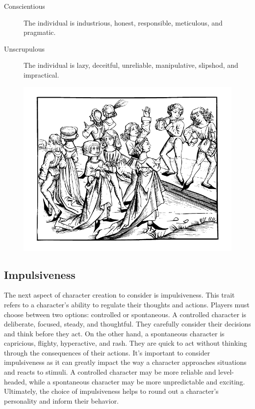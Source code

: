 \documentclass[12pt]{book}
\begin{document}
\begin{description}
    \item[Conscientious] The individual is industrious, honest, responsible, meticulous, and pragmatic.
    \item[Unscrupulous] The individual is lazy, deceitful, unreliable, manipulative, slipshod, and impractical.
\end{description}

\begin{figure}[h]
    \centering
    \includegraphics[width=\textwidth]{./images/personality04.pdf}
\end{figure}

\subsection{\textbf{Impulsiveness}}

The next aspect of character creation to consider is impulsiveness. This trait refers to a character's ability to regulate their thoughts and actions. Players must choose between two options: controlled or spontaneous. A controlled character is deliberate, focused, steady, and thoughtful. They carefully consider their decisions and think before they act. On the other hand, a spontaneous character is capricious, flighty, hyperactive, and rash. They are quick to act without thinking through the consequences of their actions. It's important to consider impulsiveness as it can greatly impact the way a character approaches situations and reacts to stimuli. A controlled character may be more reliable and level-headed, while a spontaneous character may be more unpredictable and exciting. Ultimately, the choice of impulsiveness helps to round out a character's personality and inform their behavior.
\end{document}

